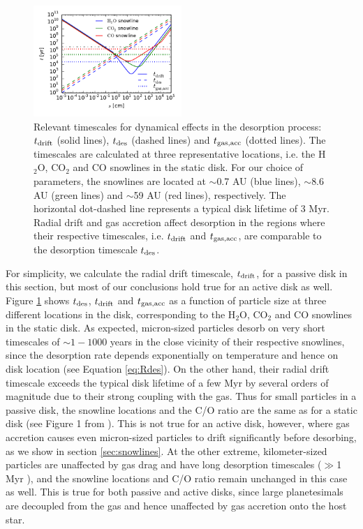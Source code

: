 \documentclass[apj]{emulateapj}
\begin{document}
\begin{figure}[h!]
\centering
\includegraphics[width=0.5\textwidth]{drift_timescales_betaS1_gas_acc_new.pdf}
\caption{Relevant timescales for dynamical effects in the desorption process: $t_{\rm drift}$ (solid lines), $t_{\rm des}$ (dashed lines) and $t_{\rm gas, acc}$ (dotted lines). The timescales are calculated at three representative locations, i.e. the H$_2$O, CO$_2$ and CO snowlines in the static disk. For our choice of parameters, the snowlines are located at $\sim$0.7 AU (blue lines), $\sim$8.6 AU (green lines) and $\sim$59 AU (red lines), respectively. The horizontal dot-dashed line represents a typical disk lifetime of 3 Myr. Radial drift and gas accretion affect desorption in the regions where their respective timescales, i.e. $t_{\rm drift}$ and $t_{\rm gas, acc}$, are comparable to the desorption timescale $t_{\rm des}$.} 
\label{fig:timescales}
\end{figure}

For simplicity, we calculate the radial drift timescale, $t_{\rm drift}$, for a passive disk in this section, but most of our conclusions hold true for an active disk as well. Figure \ref{fig:timescales} shows $t_{\rm des}$, $t_{\rm drift}$ and $t_{\rm gas, acc}$ as a function of particle size at three different locations in the disk, corresponding to the H$_2$O, CO$_2$ and CO snowlines in the static disk. As expected, micron-sized particles desorb on very short timescales of $\sim 1-1000$ years in the close vicinity of their respective snowlines, since the desorption rate depends exponentially on temperature and hence on disk location (see Equation \ref{eq:Rdes}).  On the other hand, their radial drift timescale exceeds the typical disk lifetime of a few Myr by several orders of magnitude due to their strong coupling with the gas. Thus for small particles in a passive disk, the snowline locations and the C/O ratio are the same as for a static disk (see Figure 1 from \citealt{oberg11}). This is not true for an active disk, however, where gas accretion causes even micron-sized particles to drift significantly before desorbing, as we show in section \ref{sec:snowlines}. At the other extreme, kilometer-sized particles are unaffected by gas drag and have long desorption timescales ($\gg$1 Myr ), and the snowline locations and C/O ratio remain unchanged in this case as well. This is true for both passive and active disks, since large planetesimals are decoupled from the gas and hence unaffected by gas accretion onto the host star. 
\end{document}
